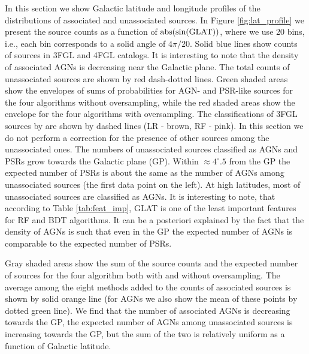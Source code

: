 In this section we show Galactic latitude and longitude profiles of the distributions of associated and unassociated sources.
In Figure \ref{fig:lat_profile} we present the source counts as a function of ${\rm abs(sin(GLAT))}$,
where we use 20 bins, i.e., each bin corresponds to a solid angle of $4 \pi / 20$. 
Solid blue lines show counts of sources in 3FGL and 4FGL catalogs.
It is interesting to note that the density of associated AGNs is decreasing near the Galactic plane.
The total counts of unassociated sources are shown by red dash-dotted lines.
Green shaded areas show the envelopes of sums of probabilities for AGN- and PSR-like sources for the four 
algorithms without oversampling, while the red shaded areas show the envelope for the four algorithms 
with oversampling.
The classifications of 3FGL sources by \cite{2016ApJ...820....8S} are shown by dashed lines (LR - brown, RF - pink).
In this section we do not perform a correction for the presence of other sources among the unassociated ones.
The numbers of unassociated sources classified as AGNs and PSRs grow towards the Galactic plane (GP).
Within $\approx 4^\circ.5$ from the GP the expected number of PSRs is about the same as the number of AGNs among unassociated sources (the first data point on the left).
At high latitudes, most of unassociated sources are classified as AGNs.
It is interesting to note, that according to Table \ref{tab:feat_imp}, GLAT is one of the least important features for RF and BDT algorithms.
It can be a posteriori explained by the fact that
 the density of AGNs is such that even in the GP the expected number of AGNs is comparable to the expected number of PSRs.

Gray shaded areas show the sum of the source counts and the expected number of sources for the four algorithm both with and without oversampling.
The average among the eight methods added to the counts of associated sources is shown by solid orange line 
(for AGNs we also show the mean of these points by dotted green line).
We find that the number of associated AGNs is decreasing towards the GP, the expected number of AGNs among unassociated sources is increasing towards the GP, but the sum of the two is relatively uniform as a function of Galactic latitude.


